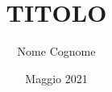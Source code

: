 \documentclass[10pt,a4paper,twoside]{memoir} %
\title{TITOLO} %
\author{Nome Cognome} %
\date{Maggio 2021} %
\begin{document}
\begin{titlingpage}
\maketitle %
\end{titlingpage}

\frontmatter %

%






%


%




%

\end{document}
